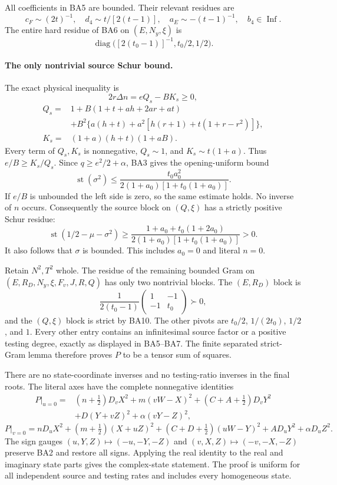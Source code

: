 All coefficients in BA5 are bounded. Their relevant residues are
\[
 c_F\sim(2t)^{-1},\quad d_4\sim t/[2(t-1)],\quad
 a_E\sim-(t-1)^{-1},\quad b_4\in\operatorname{Inf}.
\]
The entire hard residue of BA6 on $(E,N_y,\xi)$ is
\[
 \operatorname{diag}\bigl([2(t_0-1)]^{-1},t_0/2,1/2\bigr).
                                                               \tag{BA8}
\]

\paragraph{The only nontrivial source Schur bound.}
The exact physical inequality is
\[
 2r\Delta n=eQ_s-BK_s\ge0,
\]
\[
 \begin{split}
 Q_s={}&1+B(1+t+ah+2ar+at)\\
       &+B^2\{a(h+t)+a^2[h(r+1)+t(1+r-r^2)]\},\\
 K_s={}&(1+a)(h+t)(1+aB).
 \end{split}                                                       \tag{BA9}
\]
Every term of $Q_s,K_s$ is nonnegative, $Q_s\sim1$, and
$K_s\sim t(1+a)$. Thus $e/B\ge K_s/Q_s$. Since
$q\ge e^2/2+\alpha$, BA3 gives the opening-uniform bound
\[
 \operatorname{st}(\sigma^2)
 \le \frac{t_0a_0^2}
 {2(1+a_0)[1+t_0(1+a_0)]}.
\]
If $e/B$ is unbounded the left side is zero, so the same estimate
holds. No inverse of $n$ occurs. Consequently the source block on
$(Q,\xi)$ has a strictly positive Schur residue:
\[
 \operatorname{st}(1/2-\mu-\sigma^2)
 \ge\frac{1+a_0+t_0(1+2a_0)}
 {2(1+a_0)[1+t_0(1+a_0)]}>0.                         \tag{BA10}
\]
It also follows that $\sigma$ is bounded. This includes $a_0=0$
and literal $n=0$.

Retain $N^2,T^2$ whole. The residue of the remaining bounded Gram
on $(E,R_D,N_y,\xi,F_v,J,R,Q)$ has only two nontrivial blocks.
The $(E,R_D)$ block is
\[
 \frac1{2(t_0-1)}
 \begin{pmatrix}1&-1\\-1&t_0\end{pmatrix}\succ0,
\]
and the $(Q,\xi)$ block is strict by BA10. The other pivots are
$t_0/2$, $1/(2t_0)$, $1/2$, and $1$. Every other entry contains
an infinitesimal source factor or a positive testing degree, exactly
as displayed in BA5--BA7. The finite separated strict-Gram lemma
therefore proves $P$ to be a tensor sum of squares.

There are no state-coordinate inverses and no testing-ratio inverses
in the final roots. The literal axes have the complete nonnegative identities
\[
 \begin{split}
 P|_{u=0}={}&(n+\tfrac12)D_vX^2+m(vW-X)^2
 +(C+A+\tfrac12)D_vY^2\\
 &+D(Y+vZ)^2+\alpha(vY-Z)^2,
 \end{split}
\]
\[
 P|_{v=0}=nD_uX^2+(m+\tfrac12)(X+uZ)^2
 +(C+D+\tfrac12)(uW-Y)^2+AD_uY^2+\alpha D_uZ^2.
\]
The sign gauges
$(u,Y,Z)\mapsto(-u,-Y,-Z)$ and
$(v,X,Z)\mapsto(-v,-X,-Z)$ preserve BA2 and restore all signs.
Applying the real identity to the real and imaginary state parts gives
the complex-state statement. The proof is uniform for all independent
source and testing rates and includes every homogeneous state.

